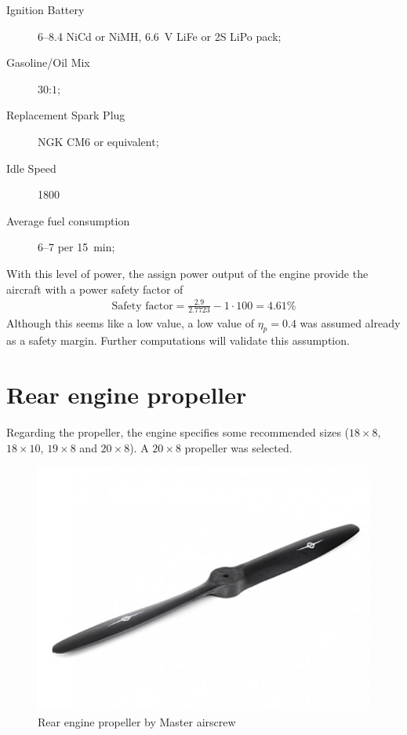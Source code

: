 \documentclass[english,fira]{ist-report}
\begin{document}
\begin{description}
\begin{description}
        \item []
        \item [Ignition Battery] \numrange{6}{8.4} NiCd or NiMH, \SI{6.6}{\volt} LiFe or 2S LiPo pack;
        \item [Gasoline/Oil Mix] $30$:$1$;
        \item [Replacement Spark Plug] NGK CM6 or equivalent;
        \item [Idle Speed] \SI{1800}{\rpm}
        \item [Average fuel consumption] \SIrange{6}{7}{\ounce} per \SI{15}{\minute};
    \end{description}
\end{description}

With this level of power, the assign power output of the engine provide the aircraft with a power safety factor of
\begin{gather*}
    \text{Safety factor} = \frac{2.9}{2.7723}-1 \cdot 100 = 4.61 \%
\end{gather*}
Although this seems like a low value, a low value of $\eta_p=0.4$ was assumed already as a safety margin. Further computations will validate this assumption. 
 \newpage 
\section{Rear engine propeller}
Regarding the propeller, the engine specifies some recommended sizes ($18\times8$, $18\times10$, $19\times8$ and $20\times8$). A $20\times8$ propeller was selected.

\begin{figure}[!ht]
	\centering
	\includegraphics[width = 0.8\linewidth]{graphics/Rear_engine_propeller.jpg}
	\caption{Rear engine propeller by Master airscrew }
	\label{fig:Rear engine propeller}
\end{figure}
\end{document}
